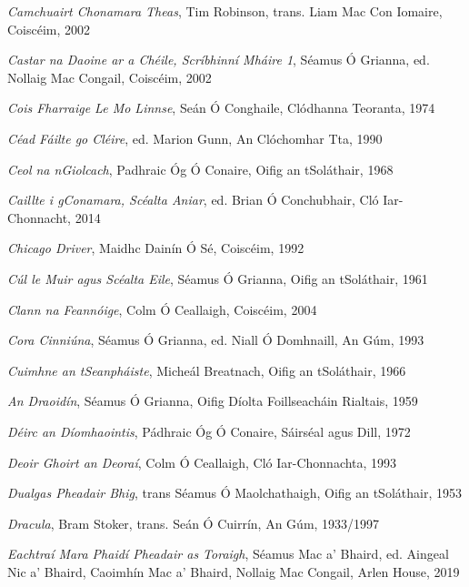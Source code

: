 \documentclass[output=paper,colorlinks,citecolor=brown]{langscibook}
\begin{document}
\begin{description}[leftmargin=!,labelwidth=\widthof{\textsc{agmts:}},font=\normalfont\scshape,noitemsep]
\item[cct:]  \textit{Camchuairt Chonamara Theas}, Tim Robinson, trans. Liam Mac Con Iomaire, 
                     Coiscéim, 2002 
\item[cdc:]  \textit{Castar na Daoine ar a Chéile, Scríbhinní Mháire 1}, Séamus Ó Grianna, 
                      ed. Nollaig Mac Congail, Coiscéim, 2002                                      
\item[cf:]  \textit{Cois Fharraige Le Mo Linnse}, Seán Ó Conghaile, Clódhanna Teoranta, 1974 
\item[cfc:]  \textit{Céad Fáilte go Cléire}, ed. Marion Gunn, An Clóchomhar Tta, 1990      
\item[cg:]  \textit{Ceol na nGiolcach}, Padhraic Óg Ó Conaire, Oifig an tSoláthair, 1968  
\item[cgc:]  \textit{Caillte i gConamara, Scéalta Aniar}, ed. Brian Ó Conchubhair, Cló
                      Iar-Chonnacht, 2014                                                          
\item[chd:]  \textit{Chicago Driver},  Maidhc Dainín Ó Sé, Coiscéim, 1992 
\item[clm:]  \textit{Cúl le Muir agus Scéalta Eile},  Séamus Ó Grianna, Oifig an tSoláthair, 1961 
\item[cnf:]  \textit{Clann na Feannóige}, Colm Ó Ceallaigh, Coiscéim, 2004 
\item[coc:]  \textit{Cora Cinniúna},  Séamus Ó Grianna, ed. Niall Ó Domhnaill, An Gúm, 1993
\item[ctp:]  \textit{Cuimhne an tSeanpháiste},  Micheál Breatnach, Oifig an tSoláthair, 1966 
\item[d:]  \textit{An Draoidín}, Séamus Ó Grianna, Oifig Díolta Foillseacháin Rialtais, 1959 
\item[dead:]  \textit{Déirc an Díomhaointis}, Pádhraic Óg Ó Conaire, Sáirséal agus Dill, 1972 
\item[dgd:]  \textit{Deoir Ghoirt an Deoraí}, Colm Ó Ceallaigh, Cló Iar-Chonnachta, 1993 
\item[dpb:]  \textit{Dualgas Pheadair Bhig}, trans Séamus Ó Maolchathaigh, Oifig an tSoláthair, 1953
\item[dr:]  \textit{Dracula}, Bram Stoker, trans. Seán Ó Cuirrín, An Gúm, 1933/1997                
\item[empp:]  \textit{Eachtraí Mara Phaidí Pheadair as Toraigh}, Séamus Mac a' Bhaird, ed.
                     Aingeal Nic a' Bhaird, Caoimhín Mac a' Bhaird, Nollaig Mac Congail, 
                     Arlen House, 2019                                                                      

\end{description}
\end{document}
